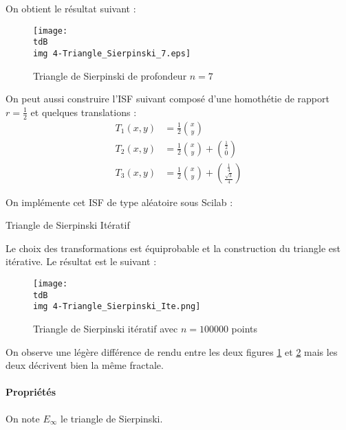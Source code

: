 			On obtient le résultat suivant :
			\begin{figure}[H]
				\centering
				\texttt{[image: \\tdB\\img 4-Triangle\_Sierpinski\_7.eps]}
				\caption{Triangle de Sierpinski de profondeur $n=7$}
				\label{img-2-triangleSierpinksi}
			\end{figure}

			On peut aussi construire l'ISF suivant composé d'une homothétie de rapport $r=\frac{1}{2}$ et quelques translations :
			\begin{align*}
				T_1(x,y) &= \frac{1}{2} \binom{x}{y}							\\
				T_2(x,y) &= \frac{1}{2} \binom{x}{y} + \binom{\frac{1}{2}}{0}	\\
				T_3(x,y) &= \frac{1}{2} \binom{x}{y} + \binom{\frac{1}{4}}{\frac{\sqrt{3}}{4}}
			\end{align*}

			On implémente cet ISF de type aléatoire sous Scilab :
			\begin{listing}[H]
				\caption{Triangle de Sierpinski Itératif}
				\label{code-2-triangleSierpinskiIteratif}
			\end{listing}

			Le choix des transformations est équiprobable et la construction du triangle est itérative.
			Le résultat est le suivant :
			\begin{figure}[H]
				\centering
				\texttt{[image: \\tdB\\img 4-Triangle\_Sierpinski\_Ite.png]}
				\caption{Triangle de Sierpinski itératif avec $n=100000$ points}
				\label{img-2-triangleSierpinksiIte}
			\end{figure}

			On observe une légère différence de rendu entre les deux figures \ref{img-2-triangleSierpinksi} et \ref{img-2-triangleSierpinksiIte} mais les deux décrivent bien la même fractale.

		\paragraph{Propriétés}
			On note $E_\infty$ le triangle de Sierpinski.

